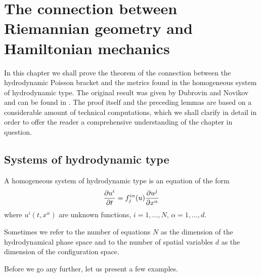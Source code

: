 \chapter{The connection between Riemannian geometry and Hamiltonian mechanics}

In this chapter we shall prove the theorem of the connection between the hydrodynamic Poisson bracket and the metrics found in the homogeneous system of hydrodynamic type. The original result was given by Dubrovin and Novikov and can be found in \cite{Dubrovin-Novikov}. The proof itself and the preceding lemmas are based on a considerable amount of technical computations, which we shall clarify in detail in order to offer the reader a comprehensive understanding of the chapter in question.



\section{Systems of hydrodynamic type}

\begin{definition}
    A homogeneous system of hydrodynamic type is an equation of the form
    \begin{align}
        \label{eq:h-system}
        \frac{\partial u^i}{\partial t} = f_j^{i \alpha} (u) \frac{\partial u^j}{\partial x^\alpha} 
    \end{align}
    where $u^i(t,x^\alpha)$ are unknown functions, $i = 1, \dots , N$, $\alpha = 1, \dots , d$.
\end{definition}

Sometimes we refer to the number of equations $N$ as the dimension of the hydrodynamical phase space and to the number of spatial variables $d$ as the dimension of the configuration space.

Before we go any further, let us present a few examples.

